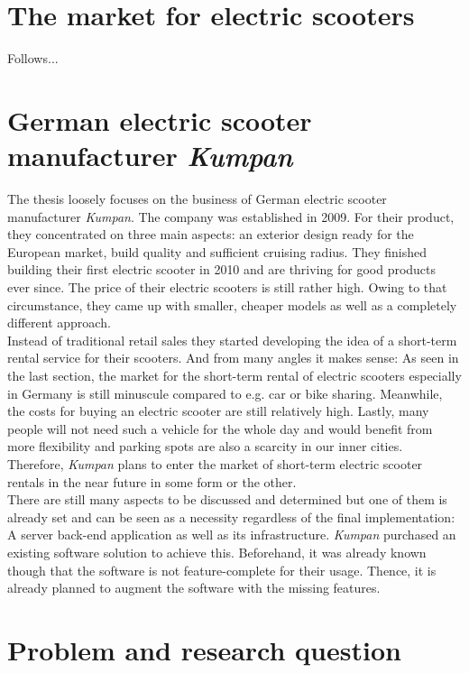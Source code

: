 \documentclass[12pt,a4paper]{report}
\begin{document}
\section{The market for electric scooters}

Follows...


\section{German electric scooter manufacturer \emph{Kumpan}}

The thesis loosely focuses on the business of German electric scooter manufacturer \emph{Kumpan}.
The company was established in 2009. For their product, they concentrated on three main aspects:
an exterior design ready for the European market, build quality and sufficient cruising radius.
They finished building their first electric scooter in 2010 and are thriving for good products ever since.
The price of their electric scooters is still rather high. Owing to that circumstance,
they came up with smaller, cheaper models as well as a completely different approach.\\
Instead of traditional retail sales they started developing the idea of a
short-term rental service for their scooters. And from many angles it makes sense:
As seen in the last section, the market for the short-term rental of electric scooters
especially in Germany is still minuscule compared to e.g. car or bike sharing.
Meanwhile, the costs for buying an electric scooter are still relatively high.
Lastly, many people will not need such a vehicle for the whole day and would benefit
from more flexibility and parking spots are also a scarcity in our inner cities.
Therefore, \emph{Kumpan} plans to enter the market of short-term electric scooter rentals
in the near future in some form or the other.\\
There are still many aspects to be discussed and determined but one of them
is already set and can be seen as a necessity regardless of the final implementation:
A server back-end application as well as its infrastructure.
\emph{Kumpan} purchased an existing software solution to achieve this.
Beforehand, it was already known though that the software is not feature-complete
for their usage. Thence, it is already planned to augment the software with the missing
features.


\section{Problem and research question}
\end{document}
